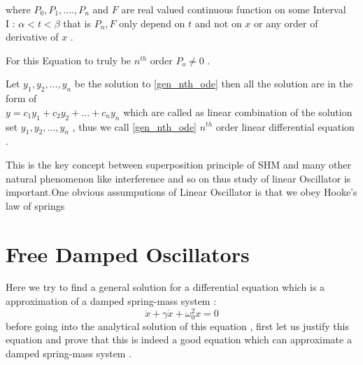 \documentclass[10pt,twoside]{report}
\begin{document}
where $P_0,P_1,....,P_n$ and $F$  are real valued continuous function on some Interval \\I : $\alpha < t < \beta$ that is $P_n,F$ only depend on $t$ and not on $x$ or any order of derivative of $x$ .

For this Equation to truly be $n^{th}$ order $P_o \neq 0 $ . 

Let $y_1,y_2,\ldots,y_n$ be the solution to \eqref{gen_nth_ode} then all the solution are in the form of \\ $y = c_1y_1+c_2y_2+ \ldots +c_ny_n$ which are called as linear combination of the solution set $y_1,y_2,\ldots,y_n$ , thus we call \eqref{gen_nth_ode} $n^{th}$ order linear differential equation . 

This is the key concept between superposition principle of SHM and many other natural phenomenon like interference and so on thus study of linear Oscillator is important.One obvious assumputions of Linear Oscillator is that we obey Hooke's law of springs 




\section{Free Damped Oscillators }
Here we try to find a general solution for a differential equation which is a approximation of a damped spring-mass system :
\begin{equation}
\label{final_FDO_form}
    \ddot{x} + \gamma \dot{x} + \omega_0^2 x = 0
\end{equation}
before going into the analytical solution of this equation , first let us justify this equation and prove that this is indeed a good equation which can approximate a damped spring-mass system .
\end{document}
